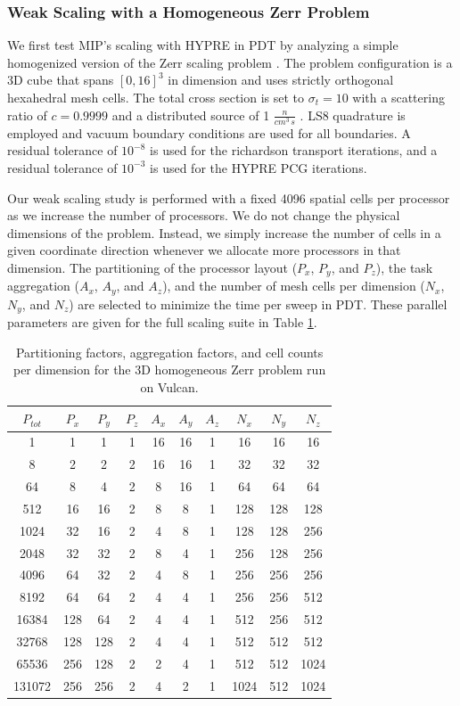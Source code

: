\subsubsection{Weak Scaling with a Homogeneous Zerr Problem}
\label{sec::DSA_Results_Scaling_Zerr}

We first test MIP's scaling with HYPRE in PDT by analyzing a simple homogenized version of the Zerr scaling problem \cite{zerr2011solution}. The problem configuration is a 3D cube that spans $[0,16]^3$ in dimension and uses strictly orthogonal hexahedral mesh cells. The total cross section is set to $\sigma_t=10$ with a scattering ratio of $c=0.9999$ and a distributed source of 1 $\frac{n}{cm^3 \, s}$ . LS8 quadrature is employed and vacuum boundary conditions are used for all boundaries. A residual tolerance of $10^{-8}$ is used for the richardson transport iterations, and a residual tolerance of $10^{-3}$ is used for the HYPRE PCG iterations.

Our weak scaling study is performed with a fixed 4096 spatial cells per processor as we increase the number of processors. We do not change the physical dimensions of the problem. Instead, we simply increase the number of cells in a given coordinate direction whenever we allocate more processors in that dimension. The partitioning of the processor layout ($P_x$, $P_y$, and $P_z$), the task aggregation ($A_x$, $A_y$, and $A_z$), and the number of mesh cells per dimension ($N_x$, $N_y$, and $N_z$) are selected to minimize the time per sweep in PDT. These parallel parameters are given for the full scaling suite in Table \ref{tab::DSA_Vulcan_agg_part}.

\begin{table}[h]
\centering
\caption{Partitioning factors, aggregation factors, and cell counts per dimension for the 3D homogeneous Zerr problem run on Vulcan.}
\begin{tabular}{|c|c|c|c|c|c|c|c|c|c|}
\hline
$P_{tot}$&$P_{x}$&$P_{y}$&$P_{z}$&$A_{x}$&$A_{y}$&$A_{z}$ &$N_{x}$&$N_{y}$&$N_{z}$ \\
\hline \hline
1&1&1&1&16&16&1& 16&16&16 \\
8&2&2&2&16&16&1&32&32&32\\
64&8&4&2&8&16&1&64&64&64\\
512&16&16&	2&8&	8&1&128&128&128\\
1024&	32&16&2&4&8&1&128&128&256\\
2048&	32&32&2&8&4&1&256&128&256\\
4096&	64&32&2&4&8&1&256&256&256\\
8192&	64&64&2&4&4&1&256&256&512\\
16384&128&	64&2&4&4&1&512&256&	512\\
32768&128&	128&2&4&4&1&512&512&	512\\
65536&256&	128&2&2&4&1&512&512&	1024\\
131072&256&256&2&4&2&1&1024&512&1024\\
\hline
\end{tabular}
\label{tab::DSA_Vulcan_agg_part}
\end{table}

